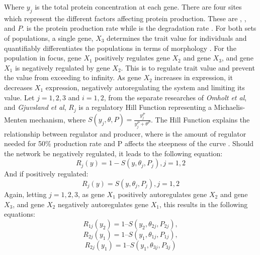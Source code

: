 Where $y_j$ is the total protein concentration at each gene. There are four sites which represent the different factors affecting protein production. These are \textit{\textalpha}, \textit{\textgamma}, \textit{\texttheta} and $P$. \textit{\textalpha} is the protein production rate while \textit{\textgamma} is the degradation rate \cite{omholt2000gene}. For both sets of populations, a single gene, $X_3$ determines the trait value for individuals and quantifiably differentiates the populations in terms of morphology \cite{orr2001genetics}. For the population in focus, gene $X_1$ positively regulates gene $X_2$ and gene $X_3$, and gene $X_1$ is negatively regulated by gene $X_2$. This is to regulate trait value and prevent the value from exceeding to infinity. As gene $X_2$ increases in expression, it decreases $X_1$ expression, negatively autoregulating the system and limiting its value. Let $j = {1,2,3}$ and $i = {1,2}$, from the separate researches of \textit{Omholt et al}, and \textit{Gjuvsland et al}, $R_{j}$ is a regulatory Hill Function representing a Michaelis-Menten mechanism, where $S(y_j,\theta,P) = \frac{y_j^P}{y_j^P+\theta^P}$. The Hill Function explains the relationship between regulator and producer, where \texttheta is the amount of regulator needed for 50\% production rate and P affects the steepness of the curve \cite{gjuvsland2007statistical,omholt2000gene}. Should the network be negatively regulated, it leads to the following equation:
\begin{equation*}
    R_{j}(y) = 1 - S(y, \theta_j , P_j), j = {1, 2} \label{eq:Negative autoregulation function} \tag{2}
\end{equation*}
And if positively regulated:
\begin{equation*}
	R_{j}(y) = S(y, \theta_j, P_j), j = {1, 2} \label{eq:Positive autoregulation function} \tag{3}
\end{equation*}
Again, letting $j = {1,2,3}$, as gene $X_1$ positively autoregulates gene $X_2$ and gene $X_3$, and gene $X_2$ negatively autoregulates gene $X_1$, this results in the following equations:
\begin{equation*}
    R_{1j}(y_2) = 1 – S(y_2, \theta_{2j}, P_{2j}) \label{eq:X1 negative autoregulation function} \tag{4.1},
\end{equation*}
\begin{equation*}
    R_{2j}(y_1) = 1 – S(y_1, \theta_{1j}, P_{1j}) \label{eq:X2 positive autoregulation function} \tag{4.2},
\end{equation*}
\begin{equation*}
    R_{2j}(y_1) = 1 – S(y_1, \theta_{3j}, P_{3j}) \label{eq:X3 positive autoregulation function} \tag{4.3}
\end{equation*}

